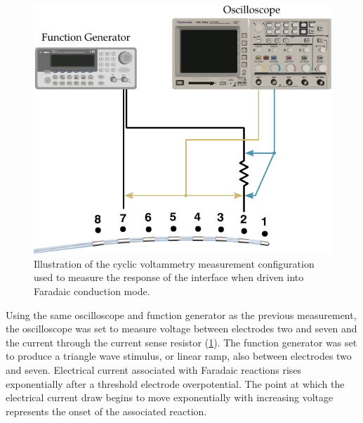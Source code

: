       \begin{figure}
        \centering
        \includegraphics{content/pt2/08-InterfaceParameters/graphics/measurement_Faradaic_setup_initial}
        \caption{\label{fig:pt2-measurement_Faradaic_setup_initial}Illustration of the cyclic voltammetry measurement configuration used to measure the response of the interface when driven into Faradaic conduction mode.}
      \end{figure}
      Using the same oscilloscope and function generator as the previous measurement, the oscilloscope was set to measure voltage between electrodes two and seven and the current through the current sense resistor (\cref{fig:pt2-measurement_Faradaic_setup_initial}).
      The function generator was set to produce a triangle wave stimulus, or linear ramp, also between electrodes two and seven.
      Electrical current associated with Faradaic reactions rises exponentially after a threshold electrode overpotential.
      The point at which the electrical current draw begins to move exponentially with increasing voltage represents the onset of the associated reaction.
